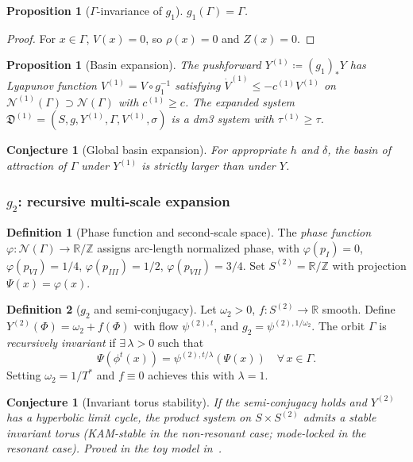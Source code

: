 \documentclass[12pt, oneside]{book}
\theoremstyle{plain}
\newtheorem{proposition}[theorem]{Proposition}
\newtheorem{conjecture}[theorem]{Conjecture}
\theoremstyle{definition}
\newtheorem{definition}{Definition}[section]
\theoremstyle{remark}
\newcommand{\R}{\mathbb{R}}
\newcommand{\dm}{\mathfrak{D}}
\newcommand{\Orb}{\Gamma}
\newcommand{\cN}{\mathcal{N}}
\begin{document}
\begin{proposition}[$\Orb$-invariance of $g_1$]\label{prop:g1inv}
$g_1(\Orb)=\Orb$.
\end{proposition}
\begin{proof}
For $x\in\Orb$, $V(x)=0$, so $\rho(x)=0$ and $Z(x)=0$.
\end{proof}

\begin{proposition}[Basin expansion]\label{prop:g1expand}
The pushforward $Y^{(1)}\coloneqq(g_1)_*Y$ has Lyapunov function
$V^{(1)}=V\circ g_1^{-1}$ satisfying $\dot V^{(1)}\le -c^{(1)}V^{(1)}$
on $\cN^{(1)}(\Orb)\supset\cN(\Orb)$ with $c^{(1)}\ge c$.
The expanded system $\dm^{(1)}=(S,g,Y^{(1)},\Orb,V^{(1)},\sigma)$
is a dm3 system with $\tau^{(1)}\ge\tau$.
\end{proposition}

\begin{conjecture}[Global basin expansion]\label{conj:global}
For appropriate $h$ and $\delta$, the basin of attraction of $\Orb$
under $Y^{(1)}$ is strictly larger than under $Y$.
\end{conjecture}

\subsubsection{\texorpdfstring{$g_2$}{g2}: recursive multi-scale expansion}

\begin{definition}[Phase function and second-scale space]\label{def:phase}
The \emph{phase function} $\varphi\colon\cN(\Orb)\to\R/\mathbb{Z}$
assigns arc-length normalized phase, with $\varphi(p_I)=0$,
$\varphi(p_{VI})=1/4$, $\varphi(p_{III})=1/2$,
$\varphi(p_{VII})=3/4$. Set $S^{(2)}=\R/\mathbb{Z}$ with
projection $\Psi(x)=\varphi(x)$.
\end{definition}

\begin{definition}[$g_2$ and semi-conjugacy]\label{def:g2}
Let $\omega_2>0$, $f\colon S^{(2)}\to\R$ smooth. Define
$Y^{(2)}(\Phi)=\omega_2+f(\Phi)$ with flow $\psi^{(2),t}$, and
$g_2=\psi^{(2),1/\omega_2}$. The orbit $\Orb$ is
\emph{recursively invariant} if $\exists\,\lambda>0$ such that
\[
  \Psi(\phi^t(x)) = \psi^{(2),t/\lambda}(\Psi(x))
  \quad\forall\,x\in\Orb.
\]
Setting $\omega_2=1/T^*$ and $f\equiv 0$ achieves this with $\lambda=1$.
\end{definition}

\begin{conjecture}[Invariant torus stability]\label{conj:torus}
If the semi-conjugacy holds and $Y^{(2)}$ has a hyperbolic limit cycle,
the product system on $S\times S^{(2)}$ admits a stable invariant torus
(KAM-stable in the non-resonant case; mode-locked in the resonant case).
Proved in the toy model in~\cite{Paper2}.
\end{conjecture}
\end{document}
